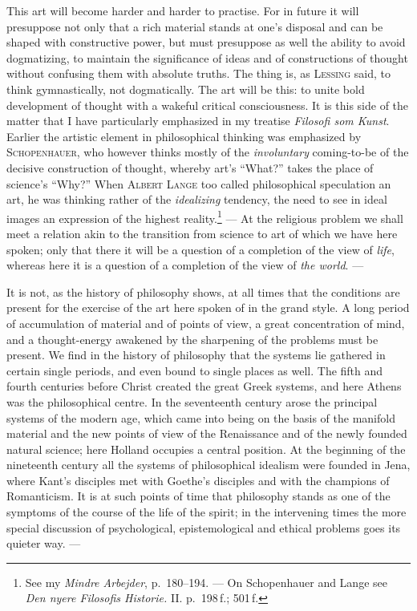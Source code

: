 \documentclass[12pt,a4paper]{book}
\newcommand{\opage}[1]{\marginnote{\footnotesize\textit{[#1]}}}
\begin{document}
This art will become harder and harder to practise. For in future it will
presuppose not only that a rich material stands at one's disposal and can be
shaped with constructive power, but must presuppose as well the ability to avoid
dogmatizing, to maintain the significance of ideas and of constructions of
thought without confusing them with absolute truths. The thing is, as
\textsc{Lessing} said, to think gymnastically, not dogmatically. The art will be
this: to unite bold development of thought with a wakeful critical consciousness.
It is this side of the matter that I have particularly emphasized in my treatise
\textit{Filosofi som Kunst}. Earlier the artistic element in philosophical
thinking was emphasized by \textsc{Schopenhauer}, who however thinks mostly of
the \emph{involuntary} coming-to-be of the decisive construction of thought,
whereby art's ``What?'' takes the place of science's ``Why?'' When
\textsc{Albert Lange} too called philosophical speculation an art, he was
thinking rather of the \emph{idealizing} tendency, the need to see in ideal
images an expression of the highest reality.\footnote{See my \textit{Mindre
Arbejder}, p.~180--194. --- On Schopenhauer and Lange see \textit{Den nyere
Filosofis Historie.} II. p.~198\,f.; 501\,f.} --- At the religious problem we
shall meet a relation akin to the transition from science to art of which we have
here spoken; only that there it will be a question of a completion of the view of
\emph{life}, whereas here it is a question of a completion of the view of
\emph{the world}. ---

\opage{59}It is not, as the history of philosophy shows, at all times that the conditions
are present for the exercise of the art here spoken of in the grand style. A long
period of accumulation of material and of points of view, a great concentration
of mind, and a thought-energy awakened by the sharpening of the problems must be
present. We find in the history of philosophy that the systems lie gathered in
certain single periods, and even bound to single places as well. The fifth and
fourth centuries before Christ created the great Greek systems, and here Athens
was the philosophical centre. In the seventeenth century arose the principal
systems of the modern age, which came into being on the basis of the manifold
material and the new points of view of the Renaissance and of the newly founded
natural science; here Holland occupies a central position. At the beginning of
the nineteenth century all the systems of philosophical idealism were founded in
Jena, where Kant's disciples met with Goethe's disciples and with the champions
of Romanticism. It is at such points of time that philosophy stands as one of the
symptoms of the course of the life of the spirit; in the intervening times the
more special discussion of psychological, epistemological and ethical problems
goes its quieter way. ---
\end{document}
